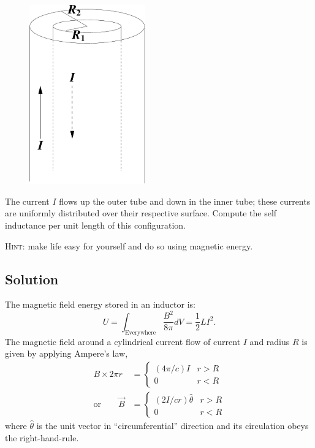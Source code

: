 \documentclass[solutions]{esg8022pset}
\begin{document}
  \begin{figure}[H]
    \centering
    \includegraphics[width = 5cm]{coaxind}
    \label{fig:coax}
  \end{figure}

  The current $I$ flows up the outer tube and down in the
  inner tube; these currents are uniformly distributed over their
  respective surface.  Compute the self inductance per unit length of
  this configuration.

  \noindent \textsc{Hint}: make life easy for yourself and do so using
  magnetic energy.
\subsection{Solution}
  The magnetic field energy stored in an inductor is:
  \begin{equation}
    U=\int_{\text{Everywhere}} \frac{B^2}{8\pi} dV = \frac{1}{2}LI^2.
  \end{equation}
  The magnetic field around a cylindrical current flow of current
  $I$ and radius $R$ is given by applying Ampere's law,
  \begin{align*}
    B\times 2\pi r & = \begin{cases}
                        (4\pi/c)I & r>R \\
                        0 & r<R
                       \end{cases} \\
    \text{or}\qquad \vec{B} & = \begin{cases}
                                  (2I/cr) \hat{\theta} & r>R \\
                                  0 & r<R
                                \end{cases}
  \end{align*}
  where $\hat{\theta}$ is the unit vector in ``circumferential''
  direction and its circulation obeys the right-hand-rule.\\
\end{document}
